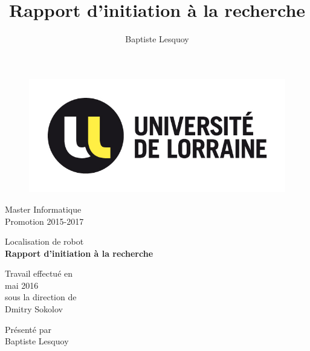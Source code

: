 \documentclass[12pt,a4paper]{report}
\author{Baptiste Lesquoy}
\title{Rapport d'initiation à la recherche}
\begin{document}
\thispagestyle{empty}

\begin{minipage}{.5\textwidth}%
\begin{figure}[H]
\includegraphics[scale=1.2]{resources/logoUniv.jpg}
\end{figure}
\end{minipage}
%
\begin{minipage}{.5\textwidth}%
\begin{flushright}
Master Informatique\\
Promotion 2015-2017
\end{flushright}
\end{minipage}

\begin{center}
{\huge Localisation de robot} \\
\textbf{Rapport d'initiation à la recherche}\\
\end{center}

\begin{minipage}{.5\textwidth}%
Travail effectué en\\
mai 2016\\ 
sous la direction de\\
Dmitry Sokolov
\end{minipage}
%
\begin{minipage}{.5\textwidth}%
\begin{flushright}
Présenté par\\
Baptiste Lesquoy\\
\end{flushright}
\end{minipage}

\setcounter{page}{0}
\newpage
\end{document}

